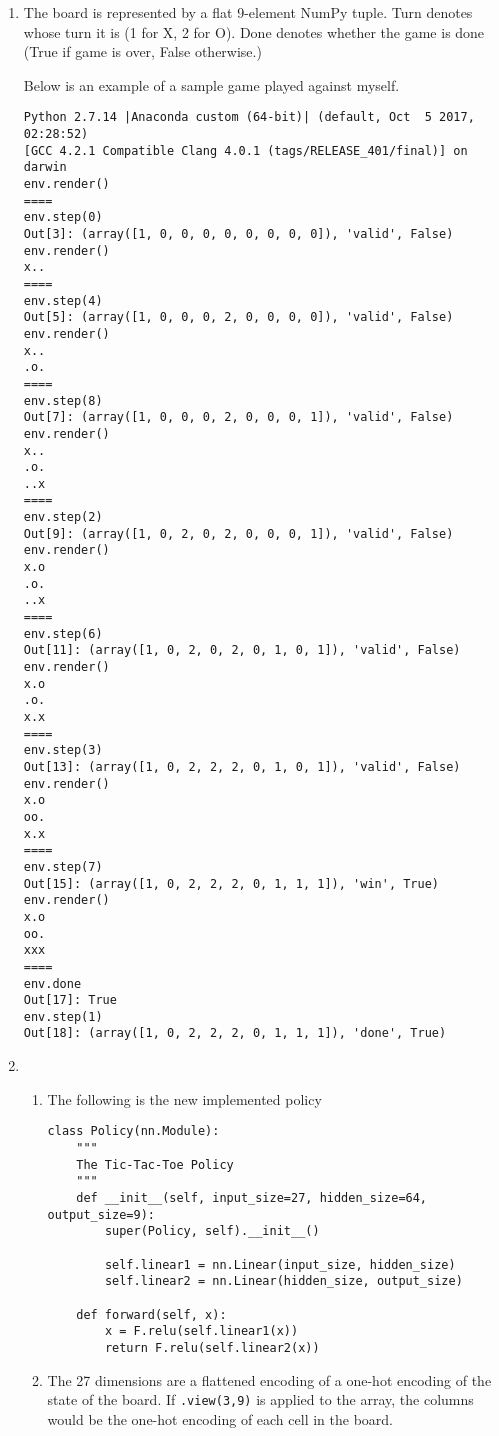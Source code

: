 \documentclass[10pt,letterpaper]{article}
\begin{document}
	\begin{enumerate}
		\item %
		The board is represented by a flat 9-element NumPy tuple. 
		Turn denotes whose turn it is (1 for X, 2 for O).
		Done denotes whether the game is done (True if game is over, False otherwise.)
		
		Below is an example of a sample game played against myself.
		\begin{verbatim}
Python 2.7.14 |Anaconda custom (64-bit)| (default, Oct  5 2017, 02:28:52) 
[GCC 4.2.1 Compatible Clang 4.0.1 (tags/RELEASE_401/final)] on darwin
env.render()
====
env.step(0)
Out[3]: (array([1, 0, 0, 0, 0, 0, 0, 0, 0]), 'valid', False)
env.render()
x..
====
env.step(4)
Out[5]: (array([1, 0, 0, 0, 2, 0, 0, 0, 0]), 'valid', False)
env.render()
x..
.o.
====
env.step(8)
Out[7]: (array([1, 0, 0, 0, 2, 0, 0, 0, 1]), 'valid', False)
env.render()
x..
.o.
..x
====
env.step(2)
Out[9]: (array([1, 0, 2, 0, 2, 0, 0, 0, 1]), 'valid', False)
env.render()
x.o
.o.
..x
====
env.step(6)
Out[11]: (array([1, 0, 2, 0, 2, 0, 1, 0, 1]), 'valid', False)
env.render()
x.o
.o.
x.x
====
env.step(3)
Out[13]: (array([1, 0, 2, 2, 2, 0, 1, 0, 1]), 'valid', False)
env.render()
x.o
oo.
x.x
====
env.step(7)
Out[15]: (array([1, 0, 2, 2, 2, 0, 1, 1, 1]), 'win', True)
env.render()
x.o
oo.
xxx
====
env.done
Out[17]: True
env.step(1)
Out[18]: (array([1, 0, 2, 2, 2, 0, 1, 1, 1]), 'done', True)
		\end{verbatim}
		\item %
		\begin{enumerate}
			\item %
			The following is the new implemented policy
\begin{lstlisting}
class Policy(nn.Module):
    """
    The Tic-Tac-Toe Policy
    """
    def __init__(self, input_size=27, hidden_size=64, output_size=9):
        super(Policy, self).__init__()

        self.linear1 = nn.Linear(input_size, hidden_size)
        self.linear2 = nn.Linear(hidden_size, output_size)

    def forward(self, x):
        x = F.relu(self.linear1(x))
        return F.relu(self.linear2(x))
\end{lstlisting}
			\item %
			The 27 dimensions are a flattened encoding of a one-hot encoding of the state of the board.
			If \verb|.view(3,9)| is applied to the array, the columns would be the one-hot encoding of each cell in the board.
			

\end{enumerate}
\end{enumerate}
\end{document}
